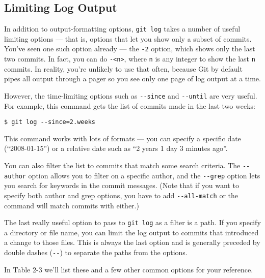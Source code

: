 \documentclass[a4paper]{book}
\begin{document}
\subsection{Limiting Log Output}

In addition to output-formatting options, \texttt{git log} takes a number of useful limiting options --- that is, options that let you show only a subset of commits. You've seen one such option already --- the \texttt{-2} option, which shows only the last two commits. In fact, you can do \texttt{-\textless{}n\textgreater{}}, where \texttt{n} is any integer to show the last \texttt{n} commits. In reality, you're unlikely to use that often, because Git by default pipes all output through a pager so you see only one page of log output at a time.

However, the time-limiting options such as \texttt{-{}-since} and \texttt{-{}-until} are very useful. For example, this command gets the list of commits made in the last two weeks:

\begin{shaded}\begin{verbatim}
$ git log --since=2.weeks
\end{verbatim}\end{shaded}

This command works with lots of formats --- you can specify a specific date (“2008-01-15”) or a relative date such as “2 years 1 day 3 minutes ago”.

You can also filter the list to commits that match some search criteria. The \texttt{-{}-author} option allows you to filter on a specific author, and the \texttt{-{}-grep} option lets you search for keywords in the commit messages. (Note that if you want to specify both author and grep options, you have to add \texttt{-{}-all-match} or the command will match commits with either.)

The last really useful option to pass to \texttt{git log} as a filter is a path. If you specify a directory or file name, you can limit the log output to commits that introduced a change to those files. This is always the last option and is generally preceded by double dashes (\texttt{-{}-}) to separate the paths from the options.

In Table 2-3 we'll list these and a few other common options for your reference.
\end{document}
